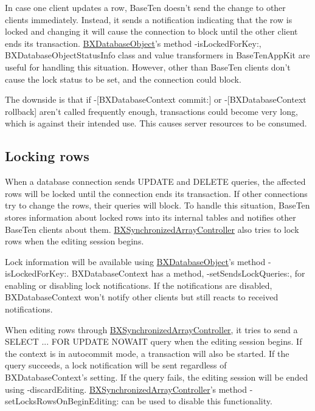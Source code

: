 In case one client updates a row, Base\+Ten doesn't send the change to other clients immediately. Instead, it sends a notification indicating that the row is locked and changing it will cause the connection to block until the other client ends its transaction. \hyperlink{interface_b_x_database_object}{B\+X\+Database\+Object}'s method -\/is\+Locked\+For\+Key\+:, B\+X\+Database\+Object\+Status\+Info class and value transformers in Base\+Ten\+App\+Kit are useful for handling this situation. However, other than Base\+Ten clients don't cause the lock status to be set, and the connection could block.

The downside is that if -\/\mbox{[}B\+X\+Database\+Context commit\+:\mbox{]} or -\/\mbox{[}B\+X\+Database\+Context rollback\mbox{]} aren't called frequently enough, transactions could become very long, which is against their intended use. This causes server resources to be consumed.\hypertarget{autocommit_manual_commit_locking_rows}{}\subsection{Locking rows}\label{autocommit_manual_commit_locking_rows}
When a database connection sends U\+P\+D\+A\+T\+E and D\+E\+L\+E\+T\+E queries, the affected rows will be locked until the connection ends its transaction. If other connections try to change the rows, their queries will block. To handle this situation, Base\+Ten stores information about locked rows into its internal tables and notifies other Base\+Ten clients about them. \hyperlink{interface_b_x_synchronized_array_controller}{B\+X\+Synchronized\+Array\+Controller} also tries to lock rows when the editing session begins.

Lock information will be available using \hyperlink{interface_b_x_database_object}{B\+X\+Database\+Object}'s method -\/is\+Locked\+For\+Key\+:. B\+X\+Database\+Context has a method, -\/set\+Sends\+Lock\+Queries\+:, for enabling or disabling lock notifications. If the notifications are disabled, B\+X\+Database\+Context won't notify other clients but still reacts to received notifications.

When editing rows through \hyperlink{interface_b_x_synchronized_array_controller}{B\+X\+Synchronized\+Array\+Controller}, it tries to send a S\+E\+L\+E\+C\+T ... F\+O\+R U\+P\+D\+A\+T\+E N\+O\+W\+A\+I\+T query when the editing session begins. If the context is in autocommit mode, a transaction will also be started. If the query succeeds, a lock notification will be sent regardless of B\+X\+Database\+Context's setting. If the query fails, the editing session will be ended using -\/discard\+Editing. \hyperlink{interface_b_x_synchronized_array_controller}{B\+X\+Synchronized\+Array\+Controller}'s method -\/set\+Locks\+Rows\+On\+Begin\+Editing\+: can be used to disable this functionality.

